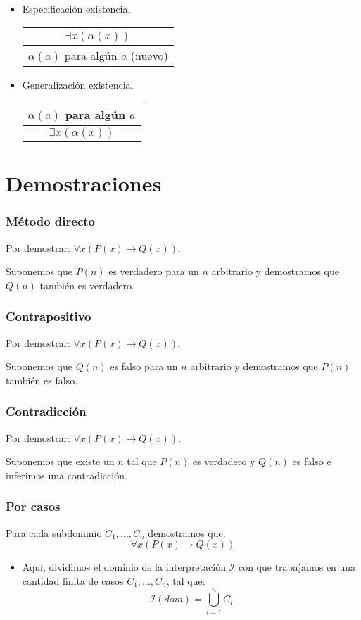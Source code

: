 \begin{multicols}{2}
\begin{itemize}
    \item Especificación existencial
    \vspace{5px}
    
    
    \begin{tabular}{c}
        $\exists x (\alpha(x))$ \\ \hline
        $\alpha(a)$ para algún $a$ (nuevo)
    \end{tabular}
    
    \item Generalización existencial
    \vspace{5px}
    
    \begin{tabular}{c}
        $\alpha(a)$ para algún $a$ \\ \hline
        $\exists x (\alpha(x))$
    \end{tabular}
    \end{itemize}
    
    \section{Demostraciones}
    \subsubsection*{Método directo}
    Por demostrar: $\forall x(P(x) \rightarrow Q(x))$. \p
    
    Suponemos que $P(n)$ es verdadero para un $n$ arbitrario y demostramos que $Q(n)$ también es verdadero.
    
    \subsubsection*{Contrapositivo}
    Por demostrar: $\forall x(P(x) \rightarrow Q(x))$. \p
    
    Suponemos que $Q(n)$ es falso para un $n$ arbitrario y demostramos que $P(n)$ también es falso.
    
    \subsubsection*{Contradicción}
    Por demostrar: $\forall x(P(x) \rightarrow Q(x))$. \p
    
    Suponemos que existe un $n$ tal que $P(n)$ es verdadero y $Q(n)$ es falso e inferimos una contradicción.
    
    \subsubsection*{Por casos}
    Para cada subdominio $C_1,\ldots,C_n$ demostramos que:
    $$
    \forall x(P(x) \rightarrow Q(x))
    $$
    \begin{itemize}
        \item Aquí, dividimos el dominio de la interpretación $\mathcal{I}$ con que trabajamos en una cantidad finita de casos $C_1,\ldots,C_n$, tal que:
        $$
        \mathcal{I}(dom) = \bigcup_{i=1}^{n}C_i
        $$
    \end{itemize}
    

\end{multicols}
